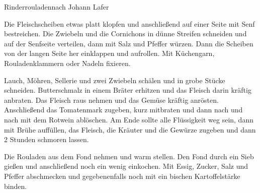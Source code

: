 \begin{recipe}{Rinderrouladen}{nach Johann Lafer}
  \label{Rinderrouladen}
  \inglist[Zutaten]
  \inglist

  \steps
  Die Fleischscheiben etwas platt klopfen und anschließend auf einer Seite mit
  Senf bestreichen. Die Zwiebeln und die Cornichons in dünne Streifen schneiden
  und auf der Senfseite verteilen, dann mit Salz und Pfeffer würzen. Dann die
  Scheiben von der langen Seite her einklappen und aufrollen. Mit Küchengarn,
  Rouladenklammern oder Nadeln fixieren.

  Lauch, Möhren, Sellerie und zwei Zwiebeln schälen und in grobe Stücke
  schneiden. Butterschmalz in einem Bräter erhitzen und das Fleisch darin
  kräftig anbraten. Das Fleisch raus nehmen und das Gemüse kräftig anrösten.
  Anschließend das Tomatenmark zugeben, kurz mitbraten und dann nach und nach
  mit dem Rotwein ablöschen. Am Ende sollte alle Flüssigkeit weg sein, dann mit
  Brühe auffüllen, das Fleisch, die Kräuter und die Gewürze zugeben und dann 2
  Stunden schmoren lassen.

  Die Rouladen aus dem Fond nehmen und warm stellen. Den Fond durch ein Sieb
  gießen und anschließend noch ein wenig einkochen. Mit Essig, Zucker, Salz und
  Pfeffer abschmecken und gegebenenfalls noch mit ein bischen Kartoffelstärke
  binden.
\end{recipe}
